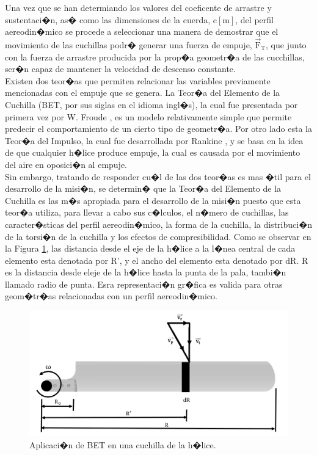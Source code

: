 \documentclass[10pt,a4paper]{book}
\begin{document}
Una vez que se han determiando los valores del coeficente de arrastre y sustentaci�n, as� como las dimensiones  de la cuerda, $\text{c} [\text{m}]$, del perfil aereodin�mico se procede a seleccionar una manera de demostrar que el movimiento de las cuchillas podr� generar una fuerza de empuje, $\overrightarrow{\text{F}}_{\text{T}}$,  que junto con la fuerza de arrastre producida por la prop�a geometr�a de las cucchillas, ser�n capaz de mantener la velocidad de descenso constante.\\

Existen dos teor�as que permiten relacionar las variables previamente mencionadas con el empuje que se genera. La Teor�a del Elemento de la Cuchilla (BET, por sus siglas en el idioma ingl�s), la cual fue presentada por primera vez por W. Froude \cite{Froude}, es un modelo relativamente simple que permite predecir el comportamiento de un cierto tipo de geometr�a. Por otro lado esta la Teor�a del Impulso, la cual fue desarrollada por Rankine \cite{Rankine}, y se basa en la idea de que cualquier h�lice produce empuje, la cual es causada por el movimiento del aire en oposici�n al empuje.\\

Sin embargo, tratando de responder cu�l de las dos teor�as es mas �til para el desarrollo de la misi�n, se determin� que la Teor�a del Elemento de la Cuchilla es las m�s apropiada para el desarrollo de la misi�n puesto que esta teor�a utiliza, para llevar a cabo sus c�lculos, el n�mero de cuchillas, las caracter�sticas del perfil aereodin�mico, la forma de la cuchilla, la distribuci�n de la torsi�n de la cuchilla y los efectos de compresibilidad. Como se observar en la Figura \ref{BET}, las distancia desde el eje de la h�lice a la l�nea central de cada elemento esta denotada por $\text{R'}$, y el ancho del elemento esta denotado por $\text{dR}$. $\text{R}$ es la distancia desde eleje de la h�lice hasta la punta de la pala, tambi�n llamado radio de punta. Esra representaci�n gr�fica es valida para otras geom�tr�as relacionadas con un perfil aereodin�mico. 

\begin{figure}[H]
\begin{center}
\includegraphics[scale=0.30]{Imagenes/BET.png}  
\caption{Aplicaci�n de BET en una cuchilla de la h�lice. }
\label{BET}
\end{center}
\end{figure}
\end{document}
